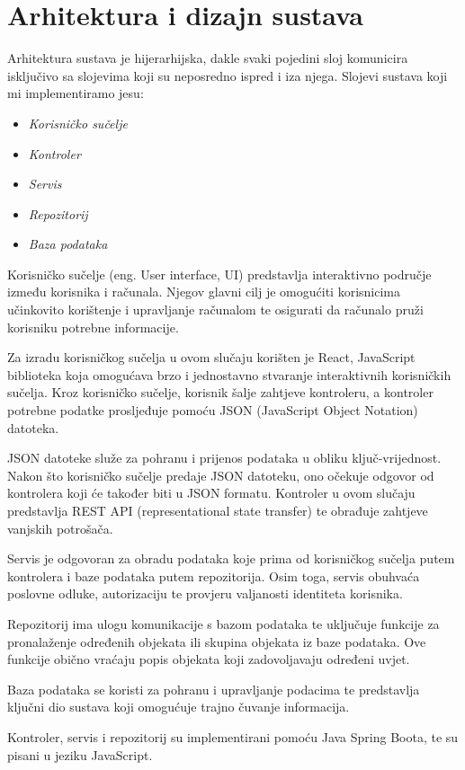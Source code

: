 \chapter{Arhitektura i dizajn sustava}

		{ Arhitektura sustava je hijerarhijska, dakle svaki pojedini sloj
			komunicira isključivo sa slojevima koji su neposredno ispred i iza njega. Slojevi sustava koji mi implementiramo jesu:}
	\begin{itemize}
		\item 	\textit{Korisničko sučelje}
		\item 	\textit{Kontroler}
		\item 	\textit{Servis}
		\item 	\textit{Repozitorij}
		\item 	\textit{Baza podataka}		
	\end{itemize}
	
		{Korisničko sučelje (eng. User interface, UI) predstavlja interaktivno područje između korisnika i računala. Njegov glavni cilj je omogućiti korisnicima učinkovito korištenje i upravljanje računalom te osigurati da računalo pruži korisniku potrebne informacije.
			
			Za izradu korisničkog sučelja u ovom slučaju korišten je React, JavaScript biblioteka koja omogućava brzo i jednostavno stvaranje interaktivnih korisničkih sučelja. Kroz korisničko sučelje, korisnik šalje zahtjeve kontroleru, a kontroler potrebne podatke prosljeđuje pomoću JSON (JavaScript Object Notation) datoteka.
			
			JSON datoteke služe za pohranu i prijenos podataka u obliku ključ-vrijednost. Nakon što korisničko sučelje predaje JSON datoteku, ono očekuje odgovor od kontrolera koji će također biti u JSON formatu. Kontroler u ovom slučaju predstavlja REST API (representational state transfer) te obrađuje zahtjeve vanjskih potrošača.
			
			Servis je odgovoran za obradu podataka koje prima od korisničkog sučelja putem kontrolera i baze podataka putem repozitorija. Osim toga, servis obuhvaća poslovne odluke, autorizaciju te provjeru valjanosti identiteta korisnika.
			
			Repozitorij ima ulogu komunikacije s bazom podataka te uključuje funkcije za pronalaženje određenih objekata ili skupina objekata iz baze podataka. Ove funkcije obično vraćaju popis objekata koji zadovoljavaju određeni uvjet.
			
			Baza podataka se koristi za pohranu i upravljanje podacima te predstavlja ključni dio sustava koji omogućuje trajno čuvanje informacija.
			
			Kontroler, servis i repozitorij su implementirani pomoću Java Spring Boota, te su pisani u jeziku JavaScript.}

